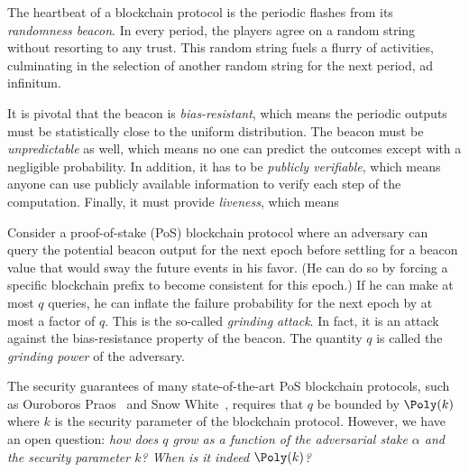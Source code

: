 
The heartbeat of a blockchain protocol is the periodic flashes from its \emph{randomness beacon}. 
In every period, the players agree on a random string without resorting to any trust. 
This random string fuels a flurry of activities, 
culminating in the selection of another random string for the next period, ad infinitum. 

It is pivotal that the beacon is \emph{bias-resistant}, 
which means the periodic outputs must be statistically close to the uniform distribution. 
The beacon must be \emph{unpredictable} as well, which means no one can predict the outcomes except with a negligible probability. 
In addition, it has to be \emph{publicly verifiable}, 
which means anyone can use publicly available information to verify each step of the computation. 
Finally, it must provide \emph{liveness}, which means 

Consider a proof-of-stake (PoS) blockchain protocol 
where an adversary can query the potential beacon output for the next epoch 
before settling for a beacon value that would sway the future events in his favor. 
(He can do so by forcing a specific blockchain prefix to become consistent for this epoch.)
If he can make at most $q$ queries, 
he can inflate the failure probability for the next epoch by at most a factor of $q$. 
This is the so-called \emph{grinding attack}. In fact,  
it is an attack against the bias-resistance property of the beacon. 
The quantity $q$ is called the \emph{grinding power} of the adversary.

The security guarantees of many state-of-the-art PoS blockchain protocols, 
such as Ouroboros Praos~\cite{Praos} and Snow White~\cite{SnowWhite}, 
requires that $q$ be bounded by $\Poly(k)$ 
where $k$ is the security parameter of the blockchain protocol. 
However, we have an open question: 
\emph{how does $q$ grow as a function of the adversarial stake $\alpha$ and the security parameter $k$? 
When is it indeed $\Poly(k)$?}

